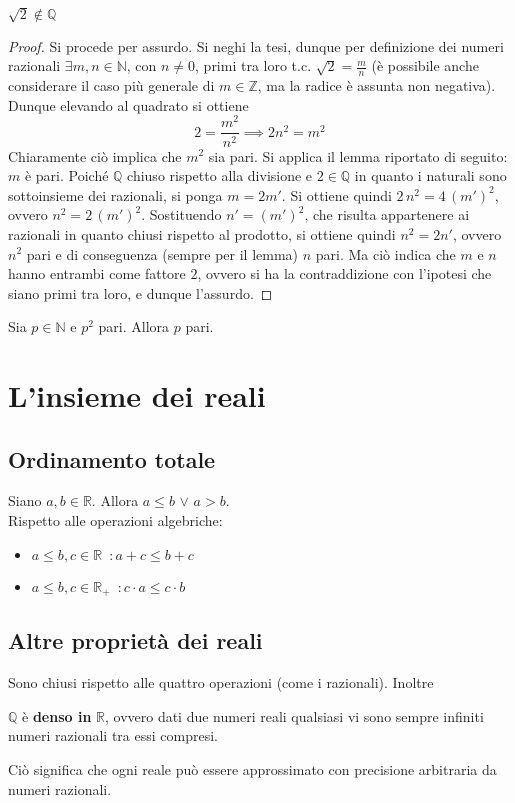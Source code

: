 \documentclass[10pt, oneside]{book}
\theoremstyle{plain}
\begin{document}
\begin{prop}
$\sqrt{2} \notin \mathbb{Q}$
\end{prop}
\begin{proof}
Si procede per assurdo. Si neghi la tesi, dunque per definizione dei numeri razionali $\exists m, n \in \mathbb{N}$, con $n \neq 0$, primi tra loro t.c. $\sqrt{2} = \frac{m}{n}$ (è possibile anche considerare il caso più generale di $m \in \mathbb{Z}$, ma la radice è assunta non negativa). Dunque elevando al quadrato si ottiene
\[2 = \frac{m^2}{n^2} \implies 2n^2 = m^2\]
Chiaramente ciò implica che $m^2$ sia pari. Si applica il lemma riportato di seguito: $m$ è pari. Poiché $\mathbb{Q}$ chiuso rispetto alla divisione e $2 \in \mathbb{Q}$ in quanto i naturali sono sottoinsieme dei razionali, si ponga $m = 2m'$. Si ottiene quindi $2 \, n^2 = 4 \, (m')^2$, ovvero $n^2 = 2 \, (m')^2$. Sostituendo $n' = (m')^2$, che risulta appartenere ai razionali in quanto chiusi rispetto al prodotto, si ottiene quindi $n^2 = 2 n'$, ovvero $n^2$ pari e di conseguenza (sempre per il lemma) $n$ pari. Ma ciò indica che $m$ e $n$ hanno entrambi come fattore $2$, ovvero si ha la contraddizione con l'ipotesi che siano primi tra loro, e dunque l'assurdo.
\end{proof}

\begin{lem}
Sia $p \in \mathbb{N}$ e $p^2$ pari. Allora $p$ pari.
\end{lem}

\chapter{L'insieme dei reali}
\section{Ordinamento totale}
\begin{prop}
    Siano $a, b \in \mathbb{R}$. Allora $a \leq b$ $\lor$ $a > b$.
    \\Rispetto alle operazioni algebriche:
    \begin{itemize}[label = $\square$]
        \item $a \leq b, c \in \mathbb{R} \enspace : a + c \leq b + c$
        \item $a \leq b, c \in \mathbb{R}_+ \enspace : c \cdot a \leq c \cdot b$
    \end{itemize}
\end{prop}

\section{Altre proprietà dei reali}
Sono chiusi rispetto alle quattro operazioni (come i razionali). Inoltre 
\begin{prop}
$\mathbb{Q}$ è \textbf{denso in} $\mathbb{R}$, ovvero dati due numeri reali qualsiasi vi sono sempre infiniti numeri razionali tra essi compresi.
\end{prop}
Ciò significa che ogni reale può essere approssimato con precisione arbitraria da numeri razionali.
\end{document}
